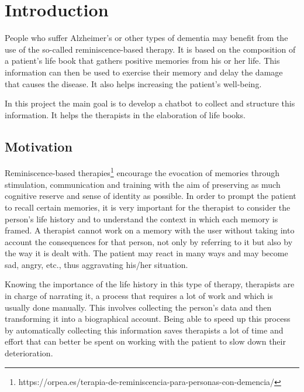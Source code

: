 \chapter{Introduction}
\label{cap:introduction}


People who suffer Alzheimer's or other types of dementia may benefit from the use of the  so-called reminiscence-based therapy. It is based on the composition of a patient's life book that gathers positive memories from his or her life. This information can then be used to exercise their memory and delay the damage that causes the disease. It also helps increasing the patient's well-being.

In this project the main goal is to develop a chatbot to collect and structure this information. It helps the therapists in the elaboration of life books.


\section{Motivation}

Reminiscence-based therapies\footnote{https://orpea.es/terapia-de-reminiscencia-para-personas-con-demencia/} encourage the evocation of memories through stimulation, communication and training with the aim of preserving as much cognitive reserve and sense of identity as possible. In order to prompt the patient to recall certain memories, it is very important for the therapist to consider the person's life history and to understand the context in which each memory is framed. A therapist cannot work on a memory with the user without taking into account the consequences for that person, not only by referring to it but also by the way it is dealt with. The patient may react in many ways and may become sad, angry, etc., thus aggravating his/her situation.

Knowing the importance of the life history in this type of therapy, therapists are in charge of narrating it, a process that requires a lot of work and which is usually done manually. This involves collecting the person's data and then transforming it into a biographical account. Being able to speed up this process by automatically collecting this information saves therapists a lot of time and effort that can better be spent on working with the patient to slow down their deterioration.

